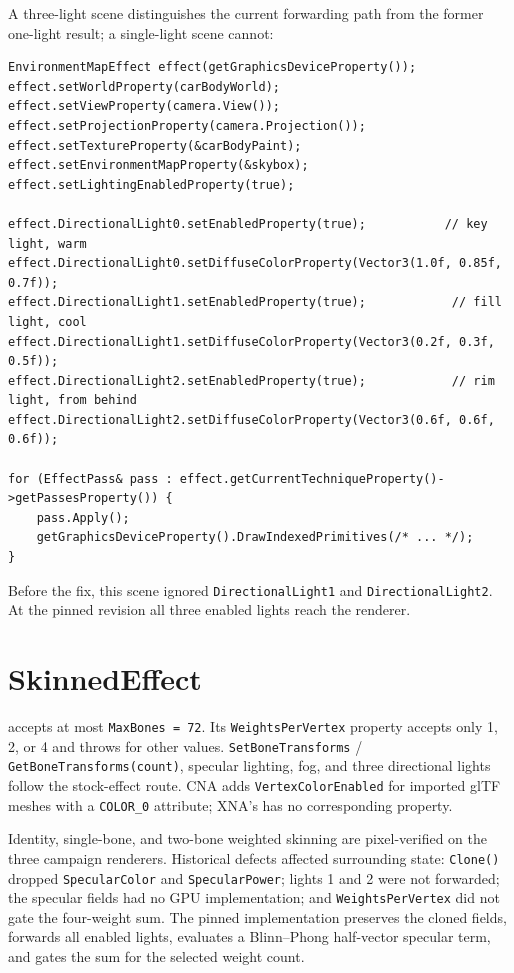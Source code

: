 A three-light scene distinguishes the current forwarding path from the former one-light result;
a single-light scene cannot:

\begin{lstlisting}
EnvironmentMapEffect effect(getGraphicsDeviceProperty());
effect.setWorldProperty(carBodyWorld);
effect.setViewProperty(camera.View());
effect.setProjectionProperty(camera.Projection());
effect.setTextureProperty(&carBodyPaint);
effect.setEnvironmentMapProperty(&skybox);
effect.setLightingEnabledProperty(true);

effect.DirectionalLight0.setEnabledProperty(true);           // key light, warm
effect.DirectionalLight0.setDiffuseColorProperty(Vector3(1.0f, 0.85f, 0.7f));
effect.DirectionalLight1.setEnabledProperty(true);            // fill light, cool
effect.DirectionalLight1.setDiffuseColorProperty(Vector3(0.2f, 0.3f, 0.5f));
effect.DirectionalLight2.setEnabledProperty(true);            // rim light, from behind
effect.DirectionalLight2.setDiffuseColorProperty(Vector3(0.6f, 0.6f, 0.6f));

for (EffectPass& pass : effect.getCurrentTechniqueProperty()->getPassesProperty()) {
    pass.Apply();
    getGraphicsDeviceProperty().DrawIndexedPrimitives(/* ... */);
}
\end{lstlisting}

Before the fix, this scene ignored \texttt{DirectionalLight1} and
\texttt{DirectionalLight2}. At the pinned revision all three enabled lights reach the renderer.

\section{SkinnedEffect}

 accepts at most \texttt{MaxBones = 72}. Its
\texttt{WeightsPerVertex} property accepts only 1, 2, or 4 and throws for other values.
\texttt{SetBoneTransforms} / \texttt{GetBoneTransforms(count)}, specular lighting, fog, and
three directional lights follow the stock-effect route. CNA adds
\texttt{VertexColorEnabled} for imported glTF meshes with a \texttt{COLOR\_0} attribute; XNA's
 has no corresponding property.

Identity, single-bone, and two-bone weighted skinning are pixel-verified on the three campaign
renderers. Historical defects affected surrounding state: \texttt{Clone()} dropped
\texttt{SpecularColor} and \texttt{SpecularPower}; lights 1 and 2 were not forwarded; the
specular fields had no GPU implementation; and \texttt{WeightsPerVertex} did not gate the
four-weight sum. The pinned implementation preserves the cloned fields, forwards all enabled
lights, evaluates a Blinn--Phong half-vector specular term, and gates the sum for the selected
weight count.

